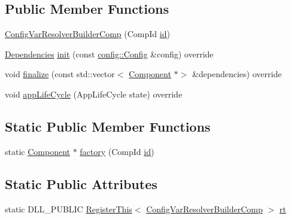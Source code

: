 \subsection*{Public Member Functions}
\begin{DoxyCompactItemize}
\item 
\hyperlink{classtheoria_1_1core_1_1ConfigVarResolverBuilderComp_a14b04299b6eec3576e515ee204004df6}{Config\+Var\+Resolver\+Builder\+Comp} (Comp\+Id \hyperlink{classtheoria_1_1core_1_1Component_ab539df9f996efceda7743fa1b69cd25d}{id})
\item 
\hyperlink{classtheoria_1_1core_1_1Dependencies}{Dependencies} \hyperlink{classtheoria_1_1core_1_1ConfigVarResolverBuilderComp_aadf94c8b3d765667eaf9d7c91ac65342}{init} (const \hyperlink{classtheoria_1_1config_1_1Config}{config\+::\+Config} \&config) override
\item 
void \hyperlink{classtheoria_1_1core_1_1ConfigVarResolverBuilderComp_ac1e585a908c7e0fa7db4bdf0a8b514bb}{finalize} (const std\+::vector$<$ \hyperlink{classtheoria_1_1core_1_1Component}{Component} $\ast$$>$ \&dependencies) override
\item 
void \hyperlink{classtheoria_1_1core_1_1ConfigVarResolverBuilderComp_ad7d3e9f8ab3a2837526ffc3eda4c6c38}{app\+Life\+Cycle} (App\+Life\+Cycle state) override
\end{DoxyCompactItemize}
\subsection*{Static Public Member Functions}
\begin{DoxyCompactItemize}
\item 
static \hyperlink{classtheoria_1_1core_1_1Component}{Component} $\ast$ \hyperlink{classtheoria_1_1core_1_1ConfigVarResolverBuilderComp_af290e5b8638b97e79d26a8d4597091ad}{factory} (Comp\+Id \hyperlink{classtheoria_1_1core_1_1Component_ab539df9f996efceda7743fa1b69cd25d}{id})
\end{DoxyCompactItemize}
\subsection*{Static Public Attributes}
\begin{DoxyCompactItemize}
\item 
static D\+L\+L\+\_\+\+P\+U\+B\+L\+IC \hyperlink{classtheoria_1_1core_1_1RegisterThis}{Register\+This}$<$ \hyperlink{classtheoria_1_1core_1_1ConfigVarResolverBuilderComp}{Config\+Var\+Resolver\+Builder\+Comp} $>$ \hyperlink{classtheoria_1_1core_1_1ConfigVarResolverBuilderComp_ac80fd840a9280e471707d18c29557d9e}{rt}
\end{DoxyCompactItemize}
